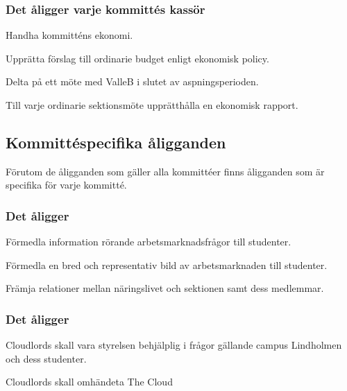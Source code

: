 \subsubsection{Det åligger varje kommittés kassör}
\begin{att}
	\item Handha kommitténs ekonomi.
	\item Upprätta förslag till ordinarie budget enligt ekonomisk policy.
	\item Delta på ett möte med ValleB i slutet av aspningsperioden.
    \item Till varje ordinarie sektionsmöte upprätthålla en ekonomisk rapport.
\end{att}

\subsection{Kommittéspecifika åligganden}
Förutom de åligganden som gäller alla kommittéer finns åligganden som är specifika för varje kommitté.

\subsubsection{Det åligger \ARMIT{}}
\begin{att}
	\item Förmedla information rörande arbetsmarknadsfrågor till studenter.
	\item Förmedla en bred och representativ bild av arbetsmarknaden till studenter.
	\item Främja relationer mellan näringslivet och sektionen samt dess medlemmar.
\end{att}

\subsubsection{Det åligger \CLOUDLORDS}
\begin{att}
	\item Cloudlords skall vara styrelsen behjälplig i frågor gällande campus Lindholmen och dess studenter.
    \item Cloudlords skall omhändeta The Cloud
\end{att}

